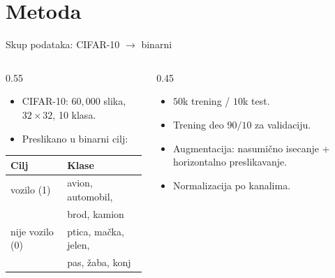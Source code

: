 \documentclass[aspectratio=169]{beamer}
\begin{document}
\section{Metoda}
\begin{frame}{Skup podataka: CIFAR-10 $\rightarrow$ binarni}
  \begin{columns}
    \begin{column}{0.55\textwidth}
      \begin{itemize}
        \item CIFAR-10: $60{,}000$ slika, $32\times32$, 10 klasa.
        \item Preslikano u binarni cilj:
      \end{itemize}
      \medskip
      \begin{tabular}{ll}
        \toprule
        \textbf{Cilj} & \textbf{Klase} \\
        \midrule
        vozilo (1)      & avion, automobil, \\ & brod, kamion \\
        nije vozilo (0) & ptica, ma\v cka, jelen, \\ & pas, \v zaba, konj \\
        \bottomrule
      \end{tabular}
    \end{column}
    \begin{column}{0.45\textwidth}
      \begin{itemize}
        \item $50$k trening / $10$k test.
        \item Trening deo $90/10$ za validaciju.
        \item Augmentacija: nasumi\v cno ise\-canje + horizontalno
              preslikavanje.
        \item Normalizacija po kanalima.
      \end{itemize}
    \end{column}
  \end{columns}
\end{frame}
\end{document}
